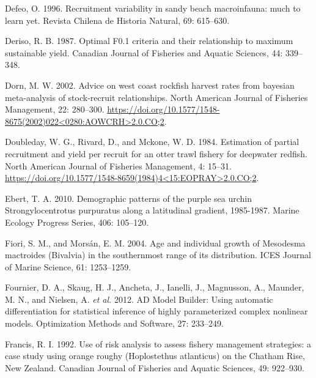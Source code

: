 \documentclass[12pt]{article}
\begin{document}
\leavevmode\hypertarget{ref-Defeo1996}{}%
Defeo, O. 1996. Recruitment variability in sandy beach macroinfauna:
much to learn yet. Revista Chilena de Historia Natural, 69: 615--630.

\leavevmode\hypertarget{ref-Deriso1987}{}%
Deriso, R. B. 1987. Optimal F0.1 criteria and their relationship to
maximum sustainable yield. Canadian Journal of Fisheries and Aquatic
Sciences, 44: 339--348.

\leavevmode\hypertarget{ref-Dorn2002}{}%
Dorn, M. W. 2002. Advice on west coast rockfish harvest rates from
bayesian meta-analysis of stock-recruit relationships. North American
Journal of Fisheries Management, 22: 280--300.
\href{https://doi.org/10.1577/1548-8675(2002)022\%3C0280:AOWCRH\%3E2.0.CO;2}{https://doi.org/10.1577/1548-8675(2002)022\textless{}0280:AOWCRH\textgreater{}2.0.CO;2}.

\leavevmode\hypertarget{ref-Doubleday1984}{}%
Doubleday, W. G., Rivard, D., and Mckone, W. D. 1984. Estimation of
partial recruitment and yield per recruit for an otter trawl fishery for
deepwater redfish. North American Journal of Fisheries Management, 4:
15--31.
\href{https://doi.org/10.1577/1548-8659(1984)4\%3C15:EOPRAY\%3E2.0.CO;2}{https://doi.org/10.1577/1548-8659(1984)4\textless{}15:EOPRAY\textgreater{}2.0.CO;2}.

\leavevmode\hypertarget{ref-Ebert2010}{}%
Ebert, T. A. 2010. Demographic patterns of the purple sea urchin
Strongylocentrotus purpuratus along a latitudinal gradient, 1985-1987.
Marine Ecology Progress Series, 406: 105--120.

\leavevmode\hypertarget{ref-Fiori2004}{}%
Fiori, S. M., and Morsán, E. M. 2004. Age and individual growth of
Mesodesma mactroides (Bivalvia) in the southernmost range of its
distribution. ICES Journal of Marine Science, 61: 1253--1259.

\leavevmode\hypertarget{ref-Fournier2012}{}%
Fournier, D. A., Skaug, H. J., Ancheta, J., Ianelli, J., Magnusson, A.,
Maunder, M. N., and Nielsen, A. \emph{et al.} 2012. AD Model Builder:
Using automatic differentiation for statistical inference of highly
parameterized complex nonlinear models. Optimization Methods and
Software, 27: 233--249.

\leavevmode\hypertarget{ref-Francis1992}{}%
Francis, R. I. 1992. Use of risk analysis to assess fishery management
strategies: a case study using orange roughy (Hoplostethus atlanticus)
on the Chatham Rise, New Zealand. Canadian Journal of Fisheries and
Aquatic Sciences, 49: 922--930.
\end{document}
